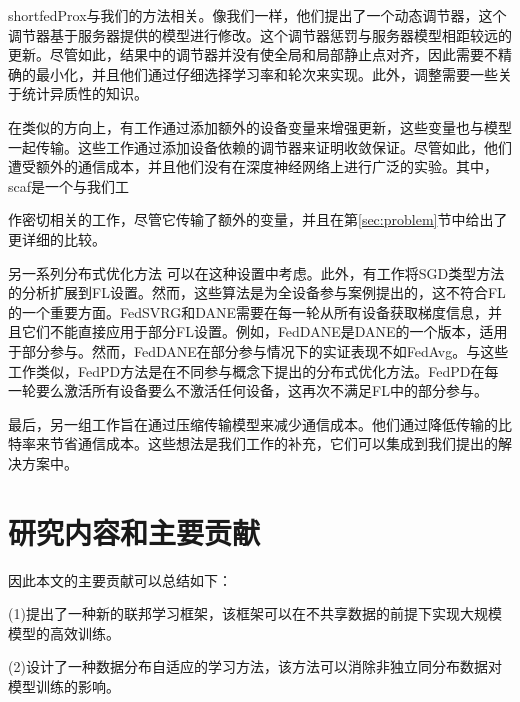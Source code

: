 shortfedProx\supercite{li2018federated}与我们的方法相关。像我们一样，他们提出了一个动态调节器，这个调节器基于服务器提供的模型进行修改。这个调节器惩罚与服务器模型相距较远的更新。尽管如此，结果中的调节器并没有使全局和局部静止点对齐，因此需要不精确的最小化，并且他们通过仔细选择学习率和轮次来实现。此外，调整需要一些关于统计异质性的知识。

在类似的方向上，有工作通过添加额外的设备变量来增强更新，这些变量也与模型一起传输\supercite{karimireddy2019scaffold,shamir2014communication}。这些工作通过添加设备依赖的调节器来证明收敛保证。尽管如此，他们遭受额外的通信成本，并且他们没有在深度神经网络上进行广泛的实验。其中，scaf\supercite{karimireddy2019scaffold}是一个与我们工

作密切相关的工作，尽管它传输了额外的变量，并且在第\ref{sec:problem}节中给出了更详细的比较。

另一系列分布式优化方法\supercite{konevcny2016federated, makhdoumi2017convergence, shamir2014communication, yuan2020federated, pathak2020fedsplit, liang2019variance, li2020acceleration, condat2020distributed}
可以在这种设置中考虑。此外，有工作将SGD类型方法的分析扩展到FL设置\supercite{unif_1,unif_2,unif_3}。然而，这些算法是为全设备参与案例提出的，这不符合FL的一个重要方面。FedSVRG\supercite{konevcny2016federated}和DANE\supercite{shamir2014communication}需要在每一轮从所有设备获取梯度信息，并且它们不能直接应用于部分FL设置。例如，FedDANE\supercite{li2019feddane}是DANE的一个版本，适用于部分参与。然而，FedDANE在部分参与情况下的实证表现不如FedAvg\supercite{li2019feddane}。与这些工作类似，FedPD\supercite{zhang2020fedpd}方法是在不同参与概念下提出的分布式优化方法。FedPD在每一轮要么激活所有设备要么不激活任何设备，这再次不满足FL中的部分参与。

最后，另一组工作旨在通过压缩传输模型来减少通信成本\supercite{dutta2019discrepancy, mishchenko2019distributed, alistarh2017qsgd}。他们通过降低传输的比特率来节省通信成本。这些想法是我们工作的补充，它们可以集成到我们提出的解决方案中。



\section{研究内容和主要贡献}

因此本文的主要贡献可以总结如下：

(1)提出了一种新的联邦学习框架，该框架可以在不共享数据的前提下实现大规模模型的高效训练。

(2)设计了一种数据分布自适应的学习方法，该方法可以消除非独立同分布数据对模型训练的影响。

